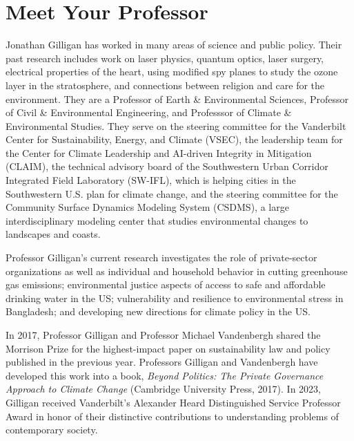 \clearpage
\section{Meet Your Professor}
Jonathan Gilligan has worked in many areas of science and public policy.
Their past research includes work on laser physics, quantum optics,
laser surgery, electrical properties of the heart, using modified spy planes to
study the ozone layer in the stratosphere, and connections between religion and
care for the environment.
They are a Professor of Earth \& Environmental Sciences,
Professor of Civil \& Environmental Engineering,
and Professsor of Climate \& Environmental Studies.
They serve on the steering committee for the Vanderbilt Center for
Sustainability, Energy, and Climate (VSEC),
the leadership team for the
Center for Climate Leadership and AI-driven Integrity in Mitigation
(CLAIM),
the technical advisory board of the
Southwestern Urban Corridor Integrated Field Laboratory (SW-IFL),
which is helping cities
in the Southwestern U.S. plan for climate change,
and the steering committee for the
Community Surface Dynamics Modeling System (CSDMS),
a large interdisciplinary modeling
center that studies environmental changes to landscapes and coasts.
\iffalse

Professor Gilligan joined the Vanderbilt Faculty in 1994 as a member of the
Department of Physics and Astronomy. In 2003, when the Department of Geology
became the Department of Earth and Environmental Science, Professor Gilligan
joined the new department to focus on atmospheric science, global climate change,
and the interactions of politics, ethics, religion, communication, and the
environment.
\fi

Professor Gilligan's current research investigates the role of private-sector
organizations as well as individual and household behavior in cutting
greenhouse gas emissions;
environmental justice aspects of access to safe and affordable drinking
water in the US;
vulnerability and resilience to environmental stress in Bangladesh;
and developing new directions for climate policy in the US.

In 2017, Professor Gilligan and Professor Michael Vandenbergh shared
the Morrison Prize for the highest-impact paper on sustainability law and
policy published in the previous year. Professors Gilligan and Vandenbergh
have developed this work into a book,
\emph{Beyond Politics: The Private Governance Approach to Climate Change\/}
(Cambridge University Press, 2017).
In 2023, Gilligan received Vanderbilt's Alexander Heard Distinguished
Service Professor Award in honor of their distinctive contributions to
understanding problems of contemporary society.

